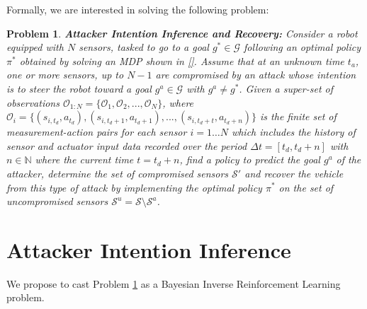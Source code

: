 \documentclass[letterpaper, 10 pt, conference]{ieeeconf}  %
\newcommand{\Ne}{\mathbb {N}}
\newtheorem{problem}{Problem}
\newcommand\NB[1]{$\spadesuit$\footnote{NB: #1}}
\begin{document}
Formally, we are interested in solving the following problem:
\begin{problem}\label{prob:p1}
{ \bf Attacker Intention Inference and Recovery:} Consider a robot equipped with $N$ sensors, tasked to go to a goal $g^* \in \mathcal G$ following an optimal policy $\pi^*$ obtained by solving an MDP shown in \eqref{}. Assume that at an unknown time $t_a$, one or more sensors, up to $N-1$ are compromised by an attack whose intention is to steer the robot toward a goal $g^a \in \mathcal G$ with $g^a \neq g^*$. Given a super-set of observations $\mathcal{O}_{1:N} = \{\mathcal{O}_{1}, \mathcal{O}_{2}, ..., \mathcal{O}_{N}\}$, where $\mathcal{O}_{i} = \{(s_{i,t_d}, a_{t_d}), (s_{i,t_d+1}, a_{t_d+1}), ..., (s_{i,t_d+t}, a_{t_d+n})\}$ is the finite set of measurement-action pairs for each sensor $i=1 \ldots N$ which includes the history of sensor and actuator input data recorded over the period $\Delta t = [t_d, t_d+n ]$ with $n \in \Ne$ where the current time $t=t_d+n$, find a policy to predict the goal $g^a$ of the attacker, determine the set of compromised sensors $\mathcal{S}'$ and recover the vehicle from this type of attack by implementing the optimal policy $\pi^*$ on the set of uncompromised sensors $\mathcal S^u = \mathcal S \setminus \mathcal{S}^a$.

\end{problem}

\section{Attacker Intention Inference}\label{sec:approach}
We propose to cast Problem \ref{prob:p1} as a Bayesian Inverse Reinforcement Learning problem. 
\end{document}
